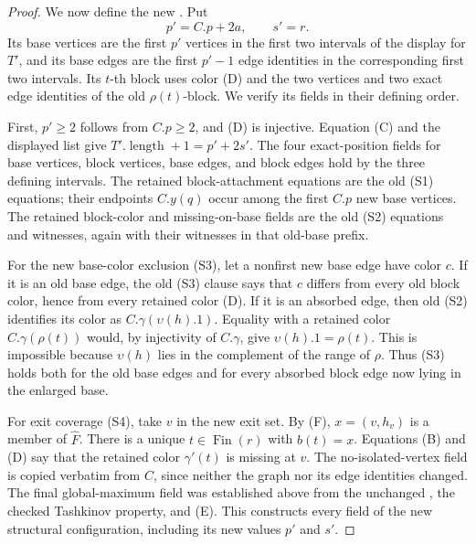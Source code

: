 \begin{proof}
We now define the new .  Put
\[
 p'=C.p+2a,\qquad s'=r.
\]
Its base vertices are the first $p'$ vertices in the first two intervals
of the display for $T'$, and its base edges are the first $p'-1$ edge
identities in the corresponding first two intervals.  Its $t$-th block
uses color (D) and the two vertices and two exact edge identities of the old
$\rho(t)$-block.  We verify its fields in their defining order.

First, $p'\ge2$ follows from $C.p\ge2$, and (D) is injective.  Equation (C)
and the displayed list give
$T'.\operatorname{length}+1=p'+2s'$.  The four exact-position fields for
base vertices, block vertices, base edges, and block edges hold by the
three defining intervals.  The retained block-attachment equations are the
old (S1) equations; their endpoints $C.y(q)$ occur among the first $C.p$
new base vertices.  The retained block-color and missing-on-base fields are
the old (S2) equations and witnesses, again with their witnesses in that
old-base prefix.

For the new base-color exclusion (S3), let a nonfirst new base edge have
color $c$.  If it is an old base edge, the old (S3) clause says that $c$
differs from every old block color, hence from every retained color (D).
If it is an absorbed edge, then old (S2) identifies its color as
$C.\gamma(\upsilon(h).1)$.  Equality with a retained color
$C.\gamma(\rho(t))$ would, by injectivity of $C.\gamma$, give
$\upsilon(h).1=\rho(t)$.  This is impossible because $\upsilon(h)$ lies in
the complement of the range of $\rho$.  Thus (S3) holds both for the old
base edges and for every absorbed block edge now lying in the enlarged
base.

For exit coverage (S4), take $v$ in the new exit set.  By (F),
$x=(v,h_v)$ is a member of $\widehat F$.  There is a unique
$t\in\operatorname{Fin}(r)$ with $b(t)=x$.  Equations (B) and (D) say that
the retained color $\gamma'(t)$ is missing at $v$.  The no-isolated-vertex
field is copied verbatim from $C$, since neither the graph nor its edge
identities changed.  The final global-maximum field was established above
from the unchanged , the checked Tashkinov property, and
(E).  This constructs every field of the new structural configuration,
including its new values $p'$ and $s'$.


\end{proof}
